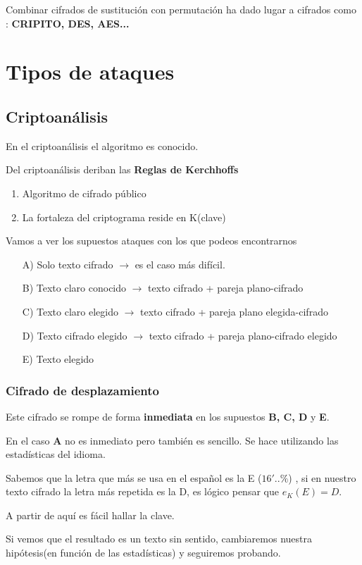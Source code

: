 \begin{remark}
Combinar cifrados de sustitución con permutación ha dado lugar a cifrados como : \textbf{CRIPITO, DES, AES...} 
\end{remark}

\section{Tipos de ataques}

\subsection{Criptoanálisis}
En el criptoanálisis el algoritmo es conocido.

Del criptoanálisis deriban las \textbf{Reglas de Kerchhoffs}
\begin{enumerate}
	\item Algoritmo de cifrado público
	\item La fortaleza del criptograma reside en K(clave)
\end{enumerate}

Vamos a ver los supuestos ataques con los que podeos encontrarnos

\begin{itemize}
	\item[A)] Solo texto cifrado $\rightarrow$ es el caso más difícil.
	\item[B)] Texto claro conocido $\rightarrow$ texto cifrado + pareja plano-cifrado 
	\item[C)] Texto claro elegido $\rightarrow$ texto cifrado + pareja plano elegida-cifrado
	\item[D)] Texto cifrado elegido $\rightarrow$ texto cifrado + pareja plano-cifrado elegido 
	\item[E)] Texto elegido 
\end{itemize}

\subsubsection{Cifrado de desplazamiento}

Este cifrado se rompe de forma \textbf{inmediata} en los supuestos \textbf{B, C, D} y \textbf{E}.

En el caso \textbf{A} no es inmediato pero también es sencillo. Se hace utilizando las estadísticas del idioma.

\begin{example}[Supuesto A-] 
	
	Sabemos que la letra que más se usa en el español es la E ($16'.. \%$) , si en nuestro texto cifrado la letra más repetida es la D, es lógico pensar que $e_K(E) = D$.
	
	A partir de aquí es fácil hallar la clave.
	
	Si vemos que el resultado es un texto sin sentido, cambiaremos nuestra hipótesis(en función de las estadísticas) y seguiremos probando.
\end{example}


